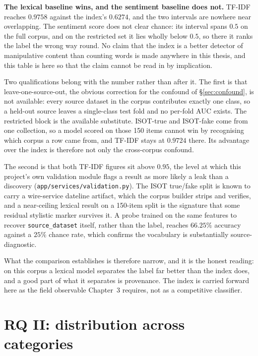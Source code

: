 \textbf{The lexical baseline wins, and the sentiment baseline does not.} TF-IDF reaches
$0.9758$ against the index's $0.6274$, and the two intervals are nowhere near overlapping. The
sentiment score does not clear chance: its interval spans $0.5$ on the full corpus, and on the
restricted set it lies wholly below $0.5$, so there it ranks the label the wrong way round. No claim that the index is a better detector of manipulative content
than counting words is made anywhere in this thesis, and this table is here so that the claim
cannot be read in by implication.

Two qualifications belong with the number rather than after it. The first is that
leave-one-source-out, the obvious correction for the confound of \S\ref{sec:confound}, is not
available: every source dataset in the corpus contributes exactly one class, so a held-out
source leaves a single-class test fold and no per-fold AUC exists. The restricted block is the
available substitute. ISOT-true and ISOT-fake come from one collection, so a model scored on
those 150 items cannot win by recognising which corpus a row came from, and TF-IDF stays at
$0.9724$ there. Its advantage over the index is therefore not only the cross-corpus confound.

The second is that both TF-IDF figures sit above $0.95$, the level at which this project's own
validation module flags a result as more likely a leak than a discovery
(\texttt{app/services/validation.py}). The ISOT true/fake split is known to carry a wire-service
dateline artifact, which the corpus builder strips and verifies, and a near-ceiling lexical
result on a 150-item split is the signature that some residual stylistic marker survives it. A
probe trained on the same features to recover \texttt{source\_dataset} itself, rather than the
label, reaches $66.25\%$ accuracy against a $25\%$ chance rate, which confirms the vocabulary
is substantially source-diagnostic.

What the comparison establishes is therefore narrow, and it is the honest reading: on this
corpus a lexical model separates the label far better than the index does, and a good part of
what it separates is provenance. The index is carried forward here as the field observable
Chapter~3 requires, not as a competitive classifier.

\section{RQ II: distribution across categories}
\label{sec:rq2}

